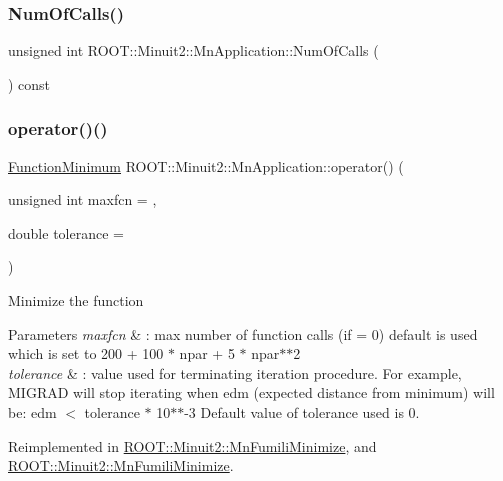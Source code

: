 \subsubsection{\texorpdfstring{NumOfCalls()}{NumOfCalls()}\hspace{0.1cm}{\footnotesize\ttfamily [2/2]}}
{\footnotesize\ttfamily unsigned int R\+O\+O\+T\+::\+Minuit2\+::\+Mn\+Application\+::\+Num\+Of\+Calls (\begin{DoxyParamCaption}{ }\end{DoxyParamCaption}) const\hspace{0.3cm}{\ttfamily [inline]}}

\mbox{\label{classROOT_1_1Minuit2_1_1MnApplication_a8908d50d5d4f7f011b94bd10e51eacf7}} 
\subsubsection{\texorpdfstring{operator()()}{operator()()}\hspace{0.1cm}{\footnotesize\ttfamily [1/2]}}
{\footnotesize\ttfamily \mbox{\hyperlink{classROOT_1_1Minuit2_1_1FunctionMinimum}{Function\+Minimum}} R\+O\+O\+T\+::\+Minuit2\+::\+Mn\+Application\+::operator() (\begin{DoxyParamCaption}\item[{unsigned int}]{maxfcn = {},  }\item[{double}]{tolerance = {} }\end{DoxyParamCaption})\hspace{0.3cm}{\ttfamily [virtual]}}

Minimize the function 
\begin{DoxyParams}{Parameters}
{\em maxfcn} & \+: max number of function calls (if = 0) default is used which is set to 200 + 100 $\ast$ npar + 5 $\ast$ npar$\ast$$\ast$2 \\
\hline
{\em tolerance} & \+: value used for terminating iteration procedure. For example, M\+I\+G\+R\+AD will stop iterating when edm (expected distance from minimum) will be\+: edm $<$ tolerance $\ast$ 10$\ast$$\ast$-\/3 Default value of tolerance used is 0. \\
\hline
\end{DoxyParams}


Reimplemented in \mbox{\hyperlink{classROOT_1_1Minuit2_1_1MnFumiliMinimize_a408e4cc7d16335d7a9bfbb8765acec6d}{R\+O\+O\+T\+::\+Minuit2\+::\+Mn\+Fumili\+Minimize}}, and \mbox{\hyperlink{classROOT_1_1Minuit2_1_1MnFumiliMinimize_a58da42cb9def0b42c424a3121987e77b}{R\+O\+O\+T\+::\+Minuit2\+::\+Mn\+Fumili\+Minimize}}.

